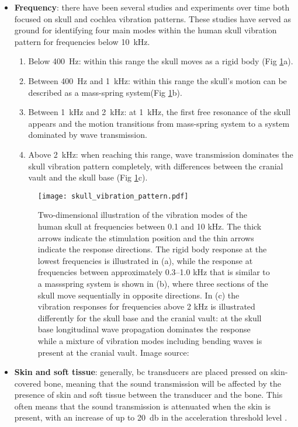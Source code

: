 \begin{itemize}
\item \textbf{Frequency}: there have been several studies and experiments over time both focused on skull and cochlea vibration patterns. These studies have served as ground for identifying four main modes within the human skull vibration pattern for frequencies below \SI{10}{\kilo\hertz}.
\begin{enumerate}
\item Below \SI{400}{\hertz}: within this range the skull moves as a rigid body (Fig \ref{fig:skull_vibration_pattern}a).\citep{stenfelt_2005b}
\item Between \SI{400}{\hertz} and \SI{1}{\kilo\hertz}: within this range the skull's motion can be described as a mass-spring system(Fig \ref{fig:skull_vibration_pattern}b).
\item Between \SI{1}{\kilo\hertz} and \SI{2}{\kilo\hertz}: at \SI{1}{\kilo\hertz}, the first free resonance of the skull appears \citep{hakansson_1994} and the motion transitions from mass-spring system to a system dominated by wave transmission.
\item Above \SI{2}{\kilo\hertz}: when reaching this range, wave transmission dominates the skull vibration pattern completely, with differences between the cranial vault and the skull base (Fig \ref{fig:skull_vibration_pattern}c).
\end{enumerate}
\begin{figure}[H]
	\centering
		\texttt{[image: skull\_vibration\_pattern.pdf]}
		\caption{Two-dimensional illustration of the vibration modes of the human skull at frequencies between 0.1 and 10 kHz. The thick arrows indicate the stimulation position and the thin arrows indicate the response directions. The rigid body response at the lowest frequencies is illustrated in (a), while the response at frequencies between approximately 0.3–1.0 kHz that is similar to a massspring system is shown in (b), where three sections of the skull move sequentially in opposite directions. In (c) the vibration responses for frequencies above 2 kHz is illustrated differently for the skull base and the cranial vault: at the skull base longitudinal wave propagation dominates the response while a mixture of vibration modes including bending waves is present at the cranial vault. Image source: \citep{puria_2013}}
		\label{fig:skull_vibration_pattern}
\end{figure}
\item \textbf{Skin and soft tissue}: generally, \gls{bc} transducers are placed pressed on skin-covered bone, meaning that the sound transmission will be affected by the presence of skin and soft tissue between the transducer and the bone. This often means that the sound transmission is attenuated when the skin is present, with an increase of up to \SI{20}{\decibel} in the acceleration threshold level \citep{hakansson_1985}.

\end{itemize}
